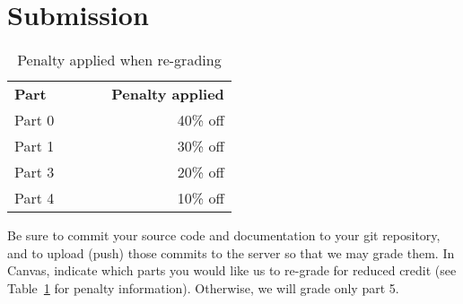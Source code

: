 \documentclass{article}
\newcommand{\parser}{3}
\newcommand{\typecheck}{4}
\newcommand{\codegen}{5}
\begin{document}
\section{Submission}

\begin{table}[h]
\centering

  \begin{tabular}{lcr}
    {\bf Part} & ~~~~ & {\bf Penalty applied} \\ \cline{1-1}\cline{3-3}
    Part 0 && 40\% off \\
    Part 1 && 30\% off \\
    Part \parser{} && 20\% off \\
    Part \typecheck{} && 10\% off
  \end{tabular}

\caption{Penalty applied when re-grading}
\label{TAB:penalties}
\end{table}

Be sure to commit your source code and documentation to your
git repository, and to upload (push) those commits to the server
so that we may grade them.
In Canvas,
indicate which parts you would like us to re-grade for reduced credit
(see Table~\ref{TAB:penalties} for penalty information).
Otherwise, we will grade only part \codegen.
\end{document}

